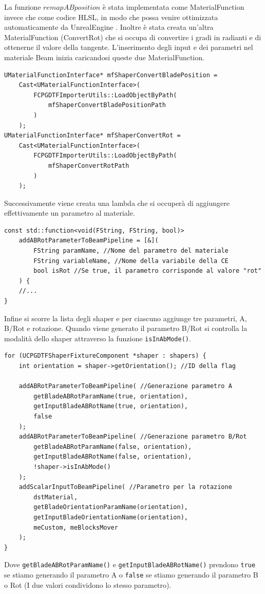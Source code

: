 \documentclass[main.tex]{subfiles}
\begin{document}
La funzione $remapABposition$ è stata implementata come MaterialFunction invece che come codice HLSL, in modo che possa venire ottimizzata automaticamente da UnrealEngine \cite{hlslNoOptimize}. Inoltre è stata creata un'altra MaterialFunction (ConvertRot) che si occupa di convertire i gradi in radianti e di ottenerne il valore della tangente. L'inserimento degli input e dei parametri nel materiale Beam inizia caricandosi queste due MaterialFunction.
\begin{lstlisting}
UMaterialFunctionInterface* mfShaperConvertBladePosition =
    Cast<UMaterialFunctionInterface>(
        FCPGDTFImporterUtils::LoadObjectByPath(
            mfShaperConvertBladePositionPath
        )
    );
UMaterialFunctionInterface* mfShaperConvertRot =
    Cast<UMaterialFunctionInterface>(
        FCPGDTFImporterUtils::LoadObjectByPath(
            mfShaperConvertRotPath
        )
    );
\end{lstlisting}
Successivamente viene creata una lambda che si occuperà di aggiungere effettivamente un parametro al materiale.
\begin{lstlisting}
const std::function<void(FString, FString, bool)>
    addABRotParameterToBeamPipeline = [&](
        FString paramName, //Nome del parametro del materiale
        FString variableName, //Nome della variabile della CE
        bool isRot //Se true, il parametro corrisponde al valore "rot"
    ) {
    //...
}
\end{lstlisting}
Infine si scorre la lista degli shaper e per ciascuno aggiunge tre parametri, A, B/Rot e rotazione. Quando viene generato il parametro B/Rot si controlla la modalità dello shaper attraverso la funzione \lstinline{isInAbMode()}.
\begin{lstlisting}
for (UCPGDTFShaperFixtureComponent *shaper : shapers) {
    int orientation = shaper->getOrientation(); //ID della flag

    addABRotParameterToBeamPipeline( //Generazione parametro A
        getBladeABRotParamName(true, orientation),
        getInputBladeABRotName(true, orientation),
        false
    );
    addABRotParameterToBeamPipeline( //Generazione parametro B/Rot
        getBladeABRotParamName(false, orientation),
        getInputBladeABRotName(false, orientation),
        !shaper->isInAbMode()
    );
    addScalarInputToBeamPipeline( //Parametro per la rotazione
        dstMaterial,
        getBladeOrientationParamName(orientation),
        getInputBladeOrientationName(orientation),
        meCustom, meBlocksMover
    );
}
\end{lstlisting}
Dove \lstinline{getBladeABRotParamName()} e \lstinline{getInputBladeABRotName()} prendono \lstinline{true} se stiamo generando il parametro A o \lstinline{false} se stiamo generando il parametro B o Rot (I due valori condividono lo stesso parametro). \newline
\end{document}
